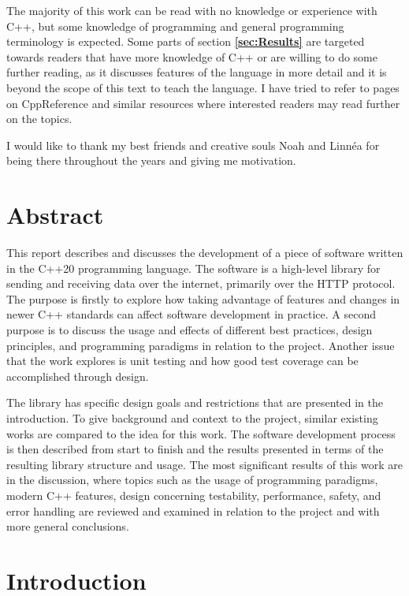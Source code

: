 \documentclass[12pt, a4paper]{article}
\begin{document}
The majority of this work can be read with no knowledge or experience with C++, but some knowledge of programming and general programming terminology is expected. Some parts of section \textbf{\ref{sec:Results}} are targeted towards readers that have more knowledge of C++ or are willing to do some further reading, as it discusses features of the language in more detail and it is beyond the scope of this text to teach the language. I have tried to refer to pages on CppReference and similar resources where interested readers may read further on the topics.

I would like to thank my best friends and creative souls Noah and Linnéa for being there throughout the years and giving me motivation.

\clearpage
\section*{Abstract}
This report describes and discusses the development of a piece of software written in the C++20 programming language. The software is a high-level library for sending and receiving data over the internet, primarily over the HTTP protocol. The purpose is firstly to explore how taking advantage of features and changes in newer C++ standards can affect software development in practice. A second purpose is to discuss the usage and effects of different best practices, design principles, and programming paradigms in relation to the project. Another issue that the work explores is unit testing and how good test coverage can be accomplished through design.\medskip

The library has specific design goals and restrictions that are presented in the introduction. To give background and context to the project, similar existing works are compared to the idea for this work. The software development process is then described from start to finish and the results presented in terms of the resulting library structure and usage. The most significant results of this work are in the discussion, where topics such as the usage of programming paradigms, modern C++ features, design concerning testability, performance, safety, and error handling are reviewed and examined in relation to the project and with more general conclusions.

\clearpage
\tableofcontents

\clearpage
\section{Introduction}
\end{document}
